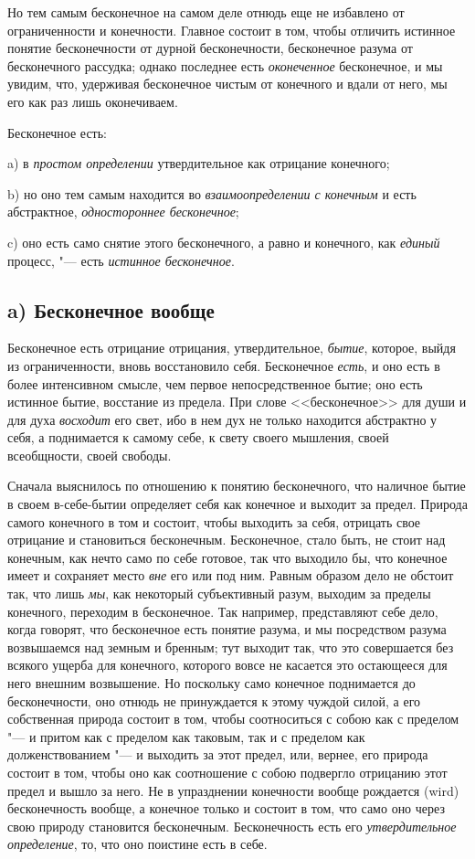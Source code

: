 Но тем самым бесконечное на самом деле отнюдь еще не избавлено от
ограниченности и конечности. Главное состоит в том, чтобы отличить истинное
понятие бесконечности от дурной бесконечности, бесконечное разума от
бесконечного рассудка; однако последнее есть
{\em оконеченное} бесконечное, и мы увидим, что,
удерживая бесконечное чистым от конечного и вдали от него, мы его как раз
лишь оконечиваем.

Бесконечное есть:

a) в {\em простом определении} утвердительное как
отрицание конечного;

b) но оно тем самым находится во {\em взаимоопределении
с конечным} и есть абстрактное, {\em одностороннее
бесконечное};

c) оно есть само снятие этого бесконечного, а равно и конечного, как
{\em единый} процесс, "--- есть
{\em истинное бесконечное}.

\subsection[a) Бесконечное вообще]{a) Бесконечное вообще}
Бесконечное есть отрицание отрицания, утвердительное,
{\em бытие}, которое, выйдя из ограниченности, вновь
восстановило себя. Бесконечное {\em есть}, и оно есть в
более интенсивном смысле, чем первое непосредственное бытие; оно есть
истинное бытие, восстание из предела. При слове <<бесконечное>> для души и
для духа {\em восходит} его свет, ибо в нем дух не
только находится абстрактно у себя, а поднимается к самому себе, к свету
своего мышления, своей всеобщности, своей свободы.

Сначала выяснилось по отношению к понятию бесконечного, что наличное бытие в
своем в-себе-бытии определяет себя как конечное и выходит за предел.
Природа самого конечного в том и состоит, чтобы выходить за себя, отрицать
свое отрицание и становиться бесконечным. Бесконечное, стало быть, не стоит
над конечным, как нечто само по себе готовое, так что выходило бы, что
конечное имеет и сохраняет место {\em вне} его или под
ним. Равным образом дело не обстоит так, что лишь
{\em мы}, как некоторый субъективный разум, выходим за
пределы конечного, переходим в бесконечное. Так например, представляют себе
дело, когда говорят, что бесконечное есть понятие разума, и мы посредством
разума возвышаемся над земным и бренным; тут выходит так, что это
совершается без всякого ущерба для конечного, которого вовсе не касается
это остающееся для него внешним возвышение. Но поскольку само конечное
поднимается до бесконечности, оно отнюдь не принуждается к этому чуждой
силой, а его собственная природа состоит в том, чтобы соотноситься с собою
как с пределом "--- и притом как с пределом как таковым, так и с пределом как
долженствованием "--- и выходить за этот предел, или, вернее, его природа
состоит в том, чтобы оно как соотношение с собою подвергло отрицанию этот
предел и вышло за него. Не в упразднении конечности вообще рождается (wird)
бесконечность вообще, а конечное только и состоит в том, что само оно через
свою природу становится бесконечным. Бесконечность есть его
{\em утвердительное определение}, то, что оно поистине есть в себе.

